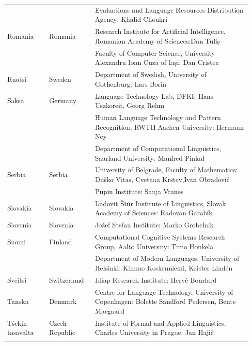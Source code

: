 \begin{longtable}{@{}llp{113mm}@{}}
  & & Evaluations and Language Resources Distribution Agency: Khalid Choukri\\ \addlinespace 
Romania & \textcolor{grey1}{Romania} & Research Institute for Artificial Intelligence, Romanian Academy of Sciences:\newline Dan Tufiș \\ \addlinespace
  & & Faculty of Computer Science, University Alexandru Ioan Cuza of Iași: Dan Cristea \\ \addlinespace
Ruotsi & \textcolor{grey1}{Sweden} & Department of Swedish, University of Gothenburg: Lars Borin \\ \addlinespace 
Saksa & \textcolor{grey1}{Germany} & Language Technology Lab, DFKI: Hans Uszkoreit, Georg Rehm\\ \addlinespace
  & & Human Language Technology and Pattern Recognition, RWTH Aachen University: Hermann Ney \\ \addlinespace
  & & Department of Computational Linguistics, Saarland University: Manfred Pinkal\\ \addlinespace 
Serbia & \textcolor{grey1}{Serbia} & University of Belgrade, Faculty of Mathematics: Duško Vitas, Cvetana Krstev,\newline Ivan Obradović \\ \addlinespace
  & & Pupin Institute: Sanja Vranes \\ \addlinespace  
Slovakia & \textcolor{grey1}{Slovakia} & Ľudovít Štúr Institute of Linguistics, Slovak Academy of Sciences: Radovan Garabík \\ \addlinespace 
Slovenia & \textcolor{grey1}{Slovenia} & Jožef Stefan Institute: Marko Grobelnik \\ \addlinespace 
Suomi & \textcolor{grey1}{Finland} & Computational Cognitive Systems Research Group, Aalto University: Timo Honkela\\ \addlinespace
& & Department of Modern Languages, University of Helsinki: Kimmo Koskenniemi, Krister Lindén \\ \addlinespace
Sveitsi & \textcolor{grey1}{Switzerland} & Idiap Research Institute: Hervé Bourlard \\ \addlinespace 
Tanska &  \textcolor{grey1}{Denmark} & Centre for Language Technology, University of Copenhagen: \newline Bolette Sandford Pedersen, Bente Maegaard\\ \addlinespace
Tšekin tasavalta & \textcolor{grey1}{Czech Republic} & Institute of Formal and Applied Linguistics, Charles University in Prague: Jan Hajič \\ \addlinespace

\end{longtable}
